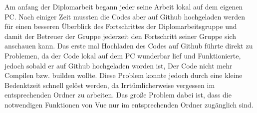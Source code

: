 Am anfang der Diplomarbeit begann jeder seine Arbeit lokal auf dem eigenen PC.
%
Nach einiger Zeit mussten die Codes aber auf Github hochgeladen werden für einen besseren Überblick 
des Fortschrittes der Diplomarbeitsgruppe und damit der Betreuer der Gruppe jederzeit den Fortschritt 
seiner Gruppe sich anschauen kann. 
%
Das erste mal Hochladen des Codes auf Github führte direkt zu Problemen, 
da der Code lokal auf dem PC wunderbar lief und Funktionierte, 
jedoch sobald er auf Github hochgeladen worden ist, 
Der Code nicht mehr Compilen bzw. builden wollte.
%
Diese Problem konnte jedoch durch eine kleine Bedenktzeit schnell gelöst werden,
da Irrtümlicherweise vergessen im entsprechenden Ordner zu arbeiten.
%
Das große Problem dabei ist, dass die notwendigen Funktionen von Vue nur im entsprechenden Ordner zugänglich sind.
%
